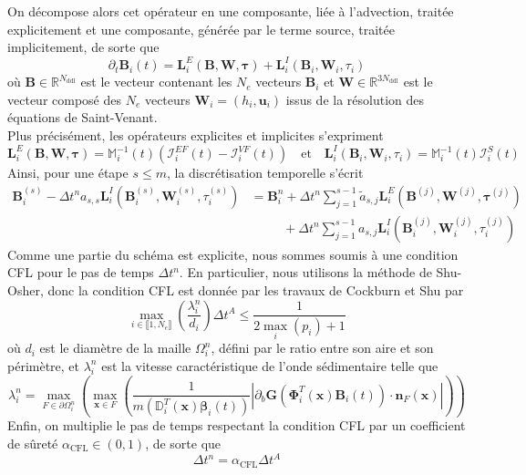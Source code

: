 \documentclass[11pt, a4paper, oneside]{report}
\begin{document}
On décompose alors cet opérateur en une composante, liée à l'advection, traitée explicitement et une composante, générée par le terme source, traitée implicitement, de sorte que
\begin{equation}
    \partial_t \bm{B}_i(t) = \bm{L}_i^E(\bm{B}, \bm{W}, \bm{\tau}) + \bm{L}_i^I(\bm{B}_i, \bm{W}_i, \tau_i)
\end{equation}
où $\bm{B} \in \mathbb{R}^{N_\text{ddl}}$ est le vecteur contenant les $N_e$  vecteurs $\bm{B}_i$ et $\bm{W} \in \mathbb{R}^{3N_\text{ddl}}$ est le vecteur composé des $N_e$ vecteurs $\bm{W}_i = (h_i, \bm{u}_i)$ issus de la résolution des équations de Saint-Venant. \\
Plus précisément, les opérateurs explicites et implicites s'expriment
\begin{equation}
    \bm{L}_i^E(\bm{B}, \bm{W}, \bm{\tau}) = \mathbb{M}_i^{-1}(t) \left( \bm{\mathcal{I}}_i^{EF}(t) - \bm{\mathcal{I}}_i^{VF}(t) \right) \quad \text{et} \quad
    \bm{L}_i^I(\bm{B}_i, \bm{W}_i, \tau_i) = \mathbb{M}_i^{-1}(t) \bm{\mathcal{I}}_i^S(t)
\end{equation}
Ainsi, pour une étape $s \leq m$, la discrétisation temporelle s'écrit
\begin{equation}
    \begin{aligned}
        \bm{B}_i^{(s)} - \Delta t^n a_{s, s} \bm{L}_i^I \left( \bm{B}_i^{(s)}, \bm{W}_i^{(s)}, \tau_i^{(s)} \right) & = \bm{B}_i^n + \Delta t^n \sum_{j = 1}^{s-1} \widetilde{a}_{s, j} \bm{L}_i^E \left( \bm{B}^{(j)}, \bm{W}^{(j)}, \bm{\tau}^{(j)} \right) \\
        & \phantom{bm{B}_i^n } + \Delta t^n \sum_{j = 1}^{s-1} a_{s, j} \bm{L}_i^I \left( \bm{B}_i^{(j)}, \bm{W}_i^{(j)}, \tau_i^{(j)} \right)
    \end{aligned}
\end{equation}
Comme une partie du schéma est explicite, nous sommes soumis à une condition CFL pour le pas de temps $\Delta t^n$. En particulier, nous utilisons la méthode de Shu-Osher, donc la condition CFL est donnée par les travaux de Cockburn et Shu \cite{cockburn2001runge} par
\begin{equation}
    \max_{i \in \llbracket 1, N_e \rrbracket} \left( \frac{\lambda_i^n}{d_i} \right) \Delta t^A \leq \frac{1}{2 \max_i (p_i) +1}
\end{equation}
où $d_i$ est le diamètre de la maille $\Omega_i^n$, défini par le ratio entre son aire et son périmètre, et $\lambda_i^n$ est la vitesse caractéristique de l'onde sédimentaire telle que
\begin{equation} \label{eq:Vitesse_onde_sedimentaire}
    \lambda_i^n = \max_{F \in \partial \Omega_i^n} \left( \max_{\bm{x} \in F} \left( \frac{1}{m \left( \mathbb{D}_i^T(\bm{x}) \bm{\beta}_i(t) \right)} \left| \partial_b \bm{G} \left( \bm{\Phi}_i^T(\bm{x}) \bm{B}_i(t) \right) \cdot \bm{n}_F(\bm{x}) \right| \right) \right)
\end{equation}
Enfin, on multiplie le pas de temps respectant la condition CFL par un coefficient de sûreté $\alpha_\text{CFL} \in (0, 1)$, de sorte que
\begin{equation}
    \Delta t^n = \alpha_\text{CFL} \Delta t^A
\end{equation}
\end{document}
